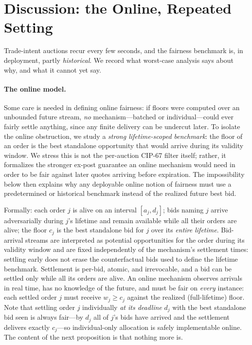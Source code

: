 \documentclass[11pt]{article}
\theoremstyle{remark}
\begin{document}
\section{Discussion: the Online, Repeated Setting}\label{sec:online}

Trade-intent auctions recur every few seconds, and the fairness benchmark
is, in deployment, partly \emph{historical}. We record what worst-case
analysis says about why, and what it cannot yet say.

\paragraph{The online model.}
Some care is needed in defining online fairness: if floors were computed
over an unbounded future stream, \emph{no} mechanism---batched or
individual---could ever fairly settle anything, since any finite delivery
can be undercut later. To isolate the online obstruction, we study a
\emph{strong lifetime-scoped benchmark}: the floor of an order is the best
standalone opportunity that would arrive during its validity window. We
stress this is not the per-auction CIP-67 filter itself; rather, it
formalizes the stronger ex-post guarantee an online mechanism would need
in order to be fair against later quotes arriving before expiration. The
impossibility below then explains why any deployable online notion of
fairness must use a predetermined or historical benchmark instead of the
realized future best bid.

Formally: each order $j$ is alive on an interval $[a_j,d_j]$; bids
naming $j$ arrive adversarially during $j$'s lifetime and remain available
while all their orders are alive; the floor $c_j$ is the best standalone
bid for $j$ over its \emph{entire lifetime}. Bid-arrival streams are
interpreted as potential opportunities for the order during its validity
window and are fixed independently of the mechanism's settlement times:
settling early does not erase the counterfactual bids used to define the
lifetime benchmark. Settlement is per-bid, atomic,
and irrevocable, and a bid can be settled only while all its orders are
alive. An online mechanism observes arrivals in real time, has no knowledge
of the future, and must be fair on \emph{every} instance: each settled
order $j$ must receive $w_j\ge c_j$ against the realized (full-lifetime)
floor. Note that settling order $j$ individually \emph{at its deadline}
$d_j$ with the best standalone bid seen is always fair---by $d_j$ all of
$j$'s bids have arrived and the settlement delivers exactly $c_j$---so
individual-only allocation is safely implementable online. The content of
the next proposition is that nothing more is.
\end{document}
